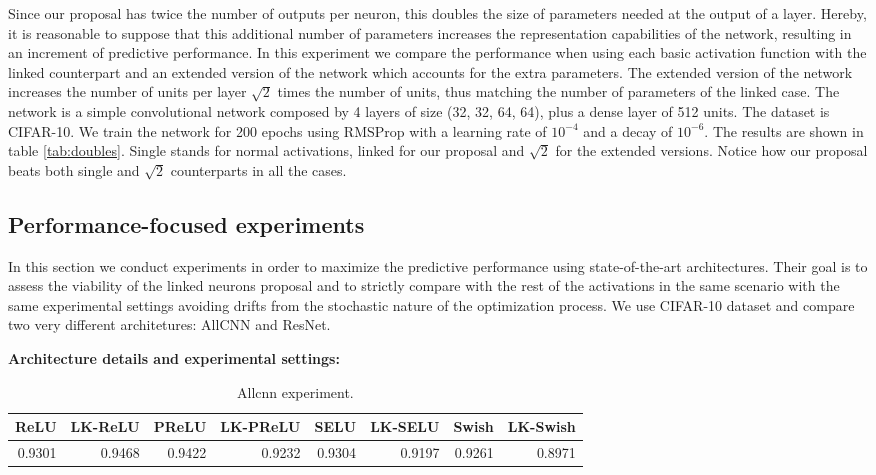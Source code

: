 \documentclass[10pt,twocolumn,letterpaper]{article}
\begin{document}
Since our proposal has twice the number of outputs per neuron, this doubles the size of parameters needed at the output of a layer. Hereby, it is reasonable to suppose that this additional number of parameters increases the representation capabilities of the network, resulting in an increment of predictive performance. In this experiment we compare the performance when using each basic activation function with the linked counterpart and an extended version of the network which accounts for the extra parameters. The extended version of the network increases the number of units per layer $\sqrt{2}$ times the number of units, thus matching the number of parameters of the linked case. The network is a simple convolutional network composed by 4 layers of size (32, 32, 64, 64), plus a dense layer of 512 units. The dataset is CIFAR-10. We train the network for 200 epochs using RMSProp \cite{rmsprop} with a learning rate of $10^{-4}$ and a decay of $10^{-6}$. The results are shown in table \ref{tab:doubles}. Single stands for normal activations, linked for our proposal and  $\sqrt{2}$ for the extended versions. Notice how our proposal beats both single and  $\sqrt{2}$ counterparts in all the cases.

\subsection{Performance-focused experiments}

In this section we conduct experiments in order to maximize the predictive performance using state-of-the-art architectures. Their goal is to assess the viability of the linked neurons proposal and to strictly compare with the rest of the activations in the same scenario with the same experimental settings avoiding drifts from the stochastic nature of the optimization process. We use CIFAR-10 dataset and compare two very different architetures: AllCNN\cite{allcnn} and ResNet\cite{resnet}.

{\bf Architecture details and experimental settings:}
\begin{table*}[h]
    \centering
    
    \begin{tabular}{rrrrrrrr}
\toprule
ReLU &  LK-ReLU &   PReLU &  LK-PReLU &    SELU &  LK-SELU &   Swish &  LK-Swish \\
\midrule
0.9301 &   0.9468 &  0.9422 &    0.9232 &  0.9304 &   0.9197 &  0.9261 &    0.8971 \\
\bottomrule
\end{tabular}
    
    \caption{Allcnn experiment.}
    \label{tab:allcnn}
\end{table*}
\end{document}
